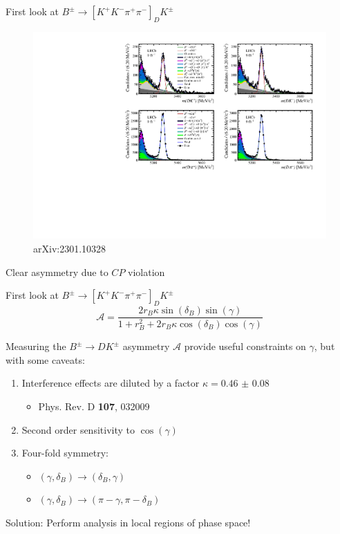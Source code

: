 \documentclass{beamer}
\begin{document}
\begin{frame}{First look at $B^\pm\to[K^+K^-\pi^+\pi^-]_DK^\pm$}
  \begin{figure}
    \centering
    \includegraphics[width = 1.0\textwidth]{Plots/d2kkpipi_fiveL_allDP_GLW.pdf}
    \caption*{\tiny arXiv:2301.10328}
  \end{figure}
  \vspace{-0.5cm}
  \begin{center}
    \Large Clear asymmetry due to $C\!P$ violation
  \end{center}
\end{frame}

\begin{frame}{First look at $B^\pm\to[K^+K^-\pi^+\pi^-]_DK^\pm$}
  \begin{equation*}
    \mathcal{A} = \frac{2r_B\kappa\sin(\delta_B)\sin(\gamma)}{1 + r_B^2 + 2r_B\kappa\cos(\delta_B)\cos(\gamma)}
  \end{equation*}
  \begin{center}
    {\large Measuring the $B^\pm\to DK^\pm$ asymmetry $\mathcal{A}$ provide useful constraints on $\gamma$, but with some caveats:}
  \end{center}
  \begin{enumerate}
    \item{Interference effects are diluted by a factor $\kappa = \SI{0.46(8)}{}$}
    \begin{itemize}
      \item{Phys. Rev. D \textbf{107}, 032009}
    \end{itemize}
    \item{Second order sensitivity to $\cos(\gamma)$}
    \item{Four-fold symmetry:}
    \begin{itemize}
      \item{$(\gamma, \delta_B)\to(\delta_B, \gamma)$}
      \item{$(\gamma, \delta_B)\to(\pi - \gamma, \pi - \delta_B)$}
    \end{itemize}
  \end{enumerate}
  \begin{center}
    \Large Solution: Perform analysis in local regions of phase space!
  \end{center}
\end{frame}
\end{document}
